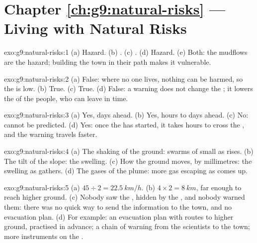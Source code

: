 \section*{Chapter \ref{ch:g9:natural-risks} --- Living with Natural Risks}

\begin{solution}{exo:g9:natural-risks:1}
(a) Hazard. (b) . (c) . (d) Hazard. (e) Both:
the mudflows are the hazard; building the town in their path makes it
vulnerable.
\end{solution}

\begin{solution}{exo:g9:natural-risks:2}
(a) False: where no one lives, nothing can be harmed, so the  is low.
(b) True. (c) True. (d) False: a warning does not change the ; it
lowers the  of the people, who can leave in time.
\end{solution}

\begin{solution}{exo:g9:natural-risks:3}
(a) Yes, days ahead. (b) Yes, hours to days ahead. (c) No: 
cannot be predicted. (d) Yes: once the  has started, it takes
hours to cross the , and the warning travels faster.
\end{solution}

\begin{solution}{exo:g9:natural-risks:4}
(a) The shaking of the ground: swarms of small  as 
rises. (b) The tilt of the slope: the  swelling. (c) How the
ground moves, by millimetres: the swelling as  gathers. (d) The
gases of the plume: more gas escaping as  comes up.
\end{solution}

\begin{solution}{exo:g9:natural-risks:5}
(a) $45 \div 2 = \qty{22.5}{km/h}$. (b) $4 \times 2 = \qty{8}{km}$, far
enough to reach higher ground. (c) Nobody saw the , hidden by the
, and nobody warned them: there was no quick way to send the
information to the town, and no evacuation plan. (d) For example: an
evacuation plan with routes to higher ground, practised in advance; a
chain of warning from the scientists to the town; more instruments on the
.
\end{solution}

